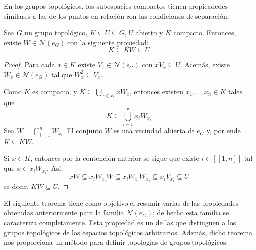 \documentclass[12pt]{report}
\theoremstyle{largebreak}
\newcommand{\N}[1]{\ensuremath{\mathscr{N}(#1)}}
\newcommand{\natint}[1]{\ensuremath{[\!\left[#1\right]\!]}}
\begin{document}
    En los grupos topológicos, los subespacios compactos tienen propieadedes similares a las de los puntos en relación con las condiciones de separación:

    \begin{theor}
        Sea $G$ un grupo topológico, $K\subseteq U\subseteq G$, $U$ abierto y $K$ compacto. Entonces, existe $W\in\N{e_G}$ con la siguiente propiedad:
        \begin{equation*}
            K\subseteq KW\subseteq U
        \end{equation*}
    \end{theor}

    \begin{proof}
        Para cada $x\in K$ existe $V_x\in\N{e_G}$ con $xV_x\subseteq U$. Además, existe $W_x\in\N{e_G}$ tal que $W_x^2\subseteq V_x$.

        Como $K$ es compacto, y $K\subseteq\bigcup_{x\in K}xW_x$, entonces existen $x_1,...,x_n\in K$ tales que
        \begin{equation*}
            K\subseteq\bigcup_{i=1}^nx_iW_{x_i}
        \end{equation*}
        Sea $W=\bigcap_{i=1}^nW_{x_i}$. El conjunto $W$ es una vecindad abierta de $e_G$ y, por ende $K\subseteq KW$.

        Si $x\in K$, entonces por la contención anterior se sigue que existe $i\in\natint{1,n}$ tal que $x\in x_iW_{x_i}$. Así:
        \begin{equation*}
            xW\subseteq x_iW_{x_i}W\subseteq x_iW_{x_i}W_{x_i}\subseteq x_iV_{x_i}\subseteq U
        \end{equation*}
        es decir, $KW\subseteq U$.
    \end{proof}

    El siguiente teorema tiene como objetivo el resumir varias de las propiedades obtenidas anteriormente para la familia $\N{e_G}$; de hecho esta familia se caracteriza completamente. Esta propiedad es un de las que distinguen a los grupos topológicos de los espacios topológicos arbitrarios. Además, dicho teorema nos proporciona un método para definir topologías de grupos topológicos.
\end{document}
